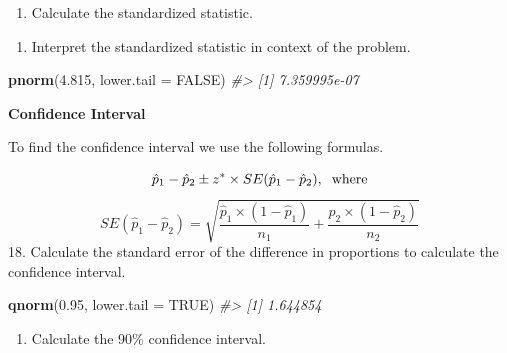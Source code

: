 \documentclass[
]{report}
\newenvironment{Shaded}{\begin{snugshade}}{\end{snugshade}}
\newcommand{\AttributeTok}[1]{\textcolor[rgb]{0.13,0.29,0.53}{#1}}
\newcommand{\CommentTok}[1]{\textcolor[rgb]{0.56,0.35,0.01}{\textit{#1}}}
\newcommand{\ConstantTok}[1]{\textcolor[rgb]{0.56,0.35,0.01}{#1}}
\newcommand{\FloatTok}[1]{\textcolor[rgb]{0.00,0.00,0.81}{#1}}
\newcommand{\FunctionTok}[1]{\textcolor[rgb]{0.13,0.29,0.53}{\textbf{#1}}}
\newcommand{\NormalTok}[1]{#1}
\providecommand{\tightlist}{%
  \setlength{\itemsep}{0pt}\setlength{\parskip}{0pt}}
\begin{document}
\begin{enumerate}
\def\labelenumi{\arabic{enumi}.}
\setcounter{enumi}{15}
\tightlist
\item
  Calculate the standardized statistic.
\end{enumerate}

\vspace{1in}

\begin{enumerate}
\def\labelenumi{\arabic{enumi}.}
\setcounter{enumi}{16}
\tightlist
\item
  Interpret the standardized statistic in context of the problem.
\end{enumerate}

\vspace{1in}

\begin{Shaded}
\begin{Highlighting}[]
\FunctionTok{pnorm}\NormalTok{(}\FloatTok{4.815}\NormalTok{, }\AttributeTok{lower.tail =} \ConstantTok{FALSE}\NormalTok{)}
\CommentTok{\#\textgreater{} [1] 7.359995e{-}07}
\end{Highlighting}
\end{Shaded}

\newpage

\textbf{Confidence Interval}

To find the confidence interval we use the following formulas.

\[\hat{p}_1-\hat{p}_2\pm z^*\times SE(\hat{p}_1-\hat{p}_2), \hspace{.2cm} \text{where}\]
\[SE(\hat{p}_1-\hat{p}_2) = \sqrt{\frac{\hat{p}_1 \times  (1-\hat{p}_1)}{n_1}+\frac{\hat{p}_2 \times  (1-\hat{p}_2)}{n_2}}\]
18. Calculate the standard error of the difference in proportions to calculate the confidence interval.

\vspace{1in}

\begin{Shaded}
\begin{Highlighting}[]
\FunctionTok{qnorm}\NormalTok{(}\FloatTok{0.95}\NormalTok{, }\AttributeTok{lower.tail =} \ConstantTok{TRUE}\NormalTok{)}
\CommentTok{\#\textgreater{} [1] 1.644854}
\end{Highlighting}
\end{Shaded}

\begin{enumerate}
\def\labelenumi{\arabic{enumi}.}
\setcounter{enumi}{18}
\tightlist
\item
  Calculate the 90\% confidence interval.
\end{enumerate}
\end{document}
